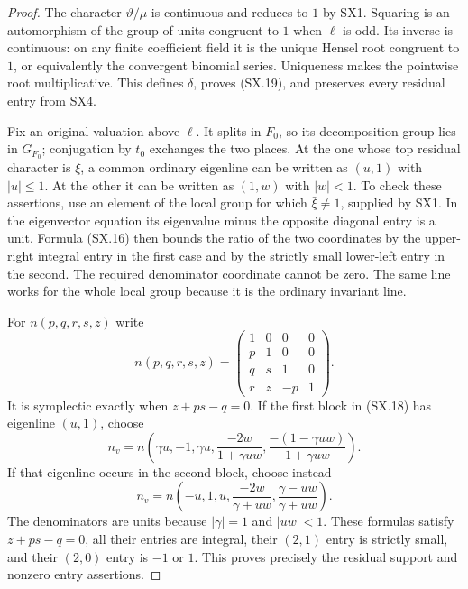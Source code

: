 \begin{proof}
The character $\vartheta/\mu$ is continuous and reduces to $1$
by SX1.  Squaring is an automorphism of the group of units
congruent to $1$ when $\ell$ is odd.  Its inverse is continuous:
on any finite coefficient field it is the unique Hensel root
congruent to $1$, or equivalently the convergent binomial series.
Uniqueness makes the pointwise root multiplicative.  This defines
$\delta$, proves (SX.19), and preserves every residual entry
from SX4.

Fix an original valuation above $\ell$.  It splits in $F_0$,
so its decomposition group lies in $G_{F_0}$; conjugation by
$t_0$ exchanges the two places.  At the one whose top residual
character is $\xi$, a common ordinary eigenline can be written
as $(u,1)$ with $|u|\le1$.  At the other it can be written as
$(1,w)$ with $|w|<1$.  To check these assertions, use an element
of the local group for which $\bar\xi\ne1$, supplied by SX1.
In the eigenvector equation its eigenvalue minus the opposite
diagonal entry is a unit.  Formula (SX.16) then bounds the ratio
of the two coordinates by the upper-right integral entry in the
first case and by the strictly small lower-left entry in the
second.  The required denominator coordinate cannot be zero.
The same line works for the whole local group because it is the
ordinary invariant line.

For $n(p,q,r,s,z)$ write
\[
 n(p,q,r,s,z)=
 \begin{pmatrix}1&0&0&0\\p&1&0&0\\q&s&1&0\\r&z&-p&1\end{pmatrix}.
                                                            \tag{SX.22}
\]
It is symplectic exactly when $z+ps-q=0$.
If the first block in (SX.18) has eigenline $(u,1)$, choose
\[
 n_v=n\left(\gamma u,-1,\gamma u,
       \frac{-2w}{1+\gamma uw},
       \frac{-(1-\gamma uw)}{1+\gamma uw}\right).     \tag{SX.23}
\]
If that eigenline occurs in the second block, choose instead
\[
 n_v=n\left(-u,1,u,
       \frac{-2w}{\gamma+uw},
       \frac{\gamma-uw}{\gamma+uw}\right).           \tag{SX.24}
\]
The denominators are units because $|\gamma|=1$ and $|uw|<1$.
These formulas satisfy $z+ps-q=0$, all their entries are
integral, their $(2,1)$ entry is strictly small, and their
$(2,0)$ entry is $-1$ or $1$.
This proves precisely the residual support and nonzero entry
assertions.


\end{proof}
